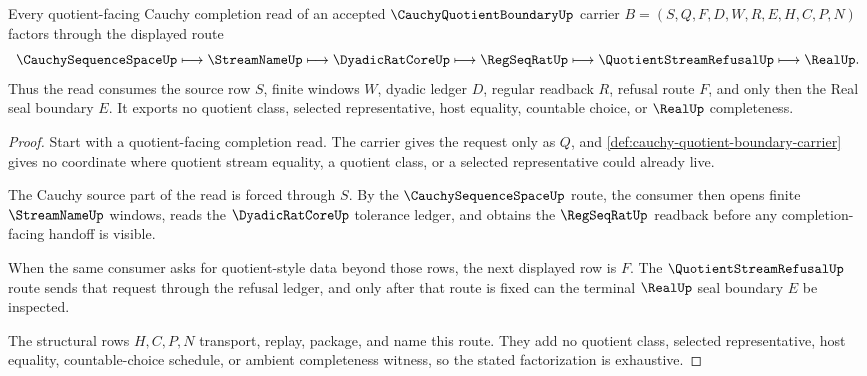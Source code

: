 \begin{theorem}\label{thm:cauchy-quotient-boundary-refusal-factorization}
Every quotient-facing Cauchy completion read of an accepted $\CauchyQuotientBoundaryUp$ carrier $B=(S,Q,F,D,W,R,E,H,C,P,N)$ factors through the displayed route
$$
\CauchySequenceSpaceUp \longmapsto \StreamNameUp \longmapsto \DyadicRatCoreUp \longmapsto \RegSeqRatUp \longmapsto \QuotientStreamRefusalUp \longmapsto \RealUp .
$$
Thus the read consumes the source row $S$, finite windows $W$, dyadic ledger $D$, regular readback $R$, refusal route $F$, and only then the Real seal boundary $E$. It exports no quotient class, selected representative, host equality, countable choice, or $\RealUp$ completeness.
\end{theorem}
\begin{proof}
Start with a quotient-facing completion read. The carrier gives the request only as $Q$, and \autoref{def:cauchy-quotient-boundary-carrier} gives no coordinate where quotient stream equality, a quotient class, or a selected representative could already live.

The Cauchy source part of the read is forced through $S$. By the $\CauchySequenceSpaceUp$ route, the consumer then opens finite $\StreamNameUp$ windows, reads the $\DyadicRatCoreUp$ tolerance ledger, and obtains the $\RegSeqRatUp$ readback before any completion-facing handoff is visible.

When the same consumer asks for quotient-style data beyond those rows, the next displayed row is $F$. The $\QuotientStreamRefusalUp$ route sends that request through the refusal ledger, and only after that route is fixed can the terminal $\RealUp$ seal boundary $E$ be inspected.

The structural rows $H,C,P,N$ transport, replay, package, and name this route. They add no quotient class, selected representative, host equality, countable-choice schedule, or ambient completeness witness, so the stated factorization is exhaustive.
\end{proof}

